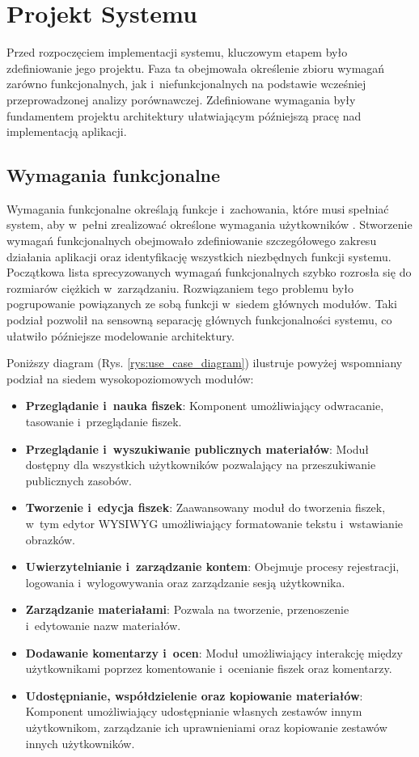 \chapter{Projekt Systemu}
\label{ch:projekt_systemu}

Przed rozpoczęciem implementacji systemu, kluczowym etapem było zdefiniowanie jego projektu. 
Faza ta obejmowała określenie zbioru wymagań zarówno funkcjonalnych, jak i~niefunkcjonalnych na 
podstawie wcześniej przeprowadzonej analizy porównawczej. Zdefiniowane wymagania były fundamentem 
projektu architektury ułatwiającym późniejszą pracę nad implementacją aplikacji.

\section{Wymagania funkcjonalne}

Wymagania funkcjonalne określają funkcje i~zachowania, które musi spełniać system, aby w~pełni zrealizować określone 
wymagania użytkowników \cite{sommerville2015}. Stworzenie wymagań funkcjonalnych obejmowało zdefiniowanie 
szczegółowego zakresu działania aplikacji oraz identyfikację wszystkich niezbędnych funkcji systemu. 
Początkowa lista sprecyzowanych wymagań funkcjonalnych szybko rozrosła się do rozmiarów ciężkich w~zarządzaniu. 
Rozwiązaniem tego problemu było pogrupowanie powiązanych ze sobą funkcji w~siedem głównych modułów. Taki podział 
pozwolił na sensowną separację głównych funkcjonalności systemu, co ułatwiło późniejsze modelowanie architektury.

Poniższy diagram (Rys. \ref{rys:use_case_diagram}) ilustruje powyżej wspomniany podział na siedem wysokopoziomowych modułów:

\begin{itemize}
    \item \textbf{Przeglądanie i~nauka fiszek}: Komponent umożliwiający odwracanie, tasowanie i~przeglądanie fiszek.
    \item \textbf{Przeglądanie i~wyszukiwanie publicznych materiałów}: Moduł dostępny dla wszystkich użytkowników pozwalający na przeszukiwanie publicznych zasobów.
    \item \textbf{Tworzenie i~edycja fiszek}: Zaawansowany moduł do tworzenia fiszek, w~tym edytor WYSIWYG umożliwiający formatowanie tekstu i~wstawianie obrazków.
    \item \textbf{Uwierzytelnianie i~zarządzanie kontem}: Obejmuje procesy rejestracji, logowania i~wylogowywania oraz zarządzanie sesją użytkownika.
    \item \textbf{Zarządzanie materiałami}: Pozwala na tworzenie, przenoszenie i~edytowanie nazw materiałów.
    \item \textbf{Dodawanie komentarzy i~ocen}: Moduł umożliwiający interakcję między użytkownikami poprzez komentowanie i~ocenianie fiszek oraz komentarzy.
    \item \textbf{Udostępnianie, współdzielenie oraz kopiowanie materiałów}: Komponent umożliwiający udostępnianie własnych zestawów innym użytkownikom, 
    zarządzanie ich uprawnieniami oraz kopiowanie zestawów innych użytkowników.
\end{itemize}

